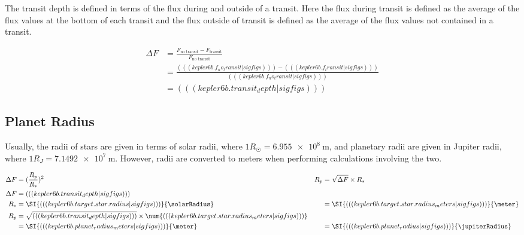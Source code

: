 The transit depth is defined in terms of the flux during and outside of a transit. Here the flux during transit is defined as the average of the
flux values at the bottom of each transit and the flux outside of transit is defined as the average of the flux values not contained in a transit.

\begin{align*}
    \Delta F &= \frac{ F_{\text{no transit}} - F_{\text{transit}} }{ F_{\text{no transit}} } \\
    &= \frac{((( kepler6b.f_no_transit|sigfigs ))) - ((( kepler6b.f_transit|sigfigs )))}{((( kepler6b.f_no_transit|sigfigs )))} \\
    &= ((( kepler6b.transit_depth|sigfigs )))
\end{align*}

\subsection{Planet Radius}

Usually, the radii of stars are given in terms of solar radii, where \(1 R_{\astrosun} = \SI{6.955e8}{\meter}\), and planetary
radii are given in Jupiter radii, where \(1 R_J = \SI{7.1492e7}{\meter}\). However, radii are converted to meters when performing calculations
involving the two.

\begin{align*}
    \Delta F &= (\frac{R_p}{R_*})^2                                                                                       &  R_p &= \sqrt{\Delta F} \times R_* \\
    \Delta F &= ((( kepler6b.transit_depth|sigfigs )))                                                                    &  & \\
    R_* &= \SI{((( kepler6b.target.star.radius|sigfigs )))}{\solarRadius}                                                 &  &= \SI{((( kepler6b.target.star.radius_meters|sigfigs )))}{\meter} \\
    R_p &= \sqrt{((( kepler6b.transit_depth|sigfigs )))} \times \num{((( kepler6b.target.star.radius_meters|sigfigs )))}  &  & \\
    &= \SI{((( kepler6b.planet_radius_meters|sigfigs )))}{\meter}                                                         &  &= \SI{((( kepler6b.planet_radius|sigfigs )))}{\jupiterRadius}
\end{align*}

